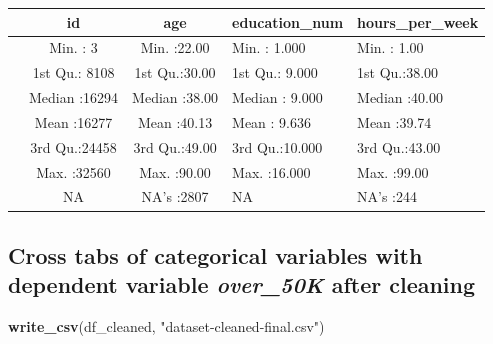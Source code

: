\documentclass[]{article}
\newenvironment{Shaded}{\begin{snugshade}}{\end{snugshade}}
\newcommand{\DataTypeTok}[1]{\textcolor[rgb]{0.13,0.29,0.53}{#1}}
\newcommand{\KeywordTok}[1]{\textcolor[rgb]{0.13,0.29,0.53}{\textbf{#1}}}
\newcommand{\NormalTok}[1]{#1}
\newcommand{\OperatorTok}[1]{\textcolor[rgb]{0.81,0.36,0.00}{\textbf{#1}}}
\newcommand{\StringTok}[1]{\textcolor[rgb]{0.31,0.60,0.02}{#1}}
\begin{document}
\begin{longtable}[]{@{}lccll@{}}
\toprule
& id & age & education\_num & hours\_per\_week\tabularnewline
\midrule
\endhead
& Min. : 3 & Min. :22.00 & Min. : 1.000 & Min. : 1.00\tabularnewline
& 1st Qu.: 8108 & 1st Qu.:30.00 & 1st Qu.: 9.000 & 1st
Qu.:38.00\tabularnewline
& Median :16294 & Median :38.00 & Median : 9.000 & Median
:40.00\tabularnewline
& Mean :16277 & Mean :40.13 & Mean : 9.636 & Mean :39.74\tabularnewline
& 3rd Qu.:24458 & 3rd Qu.:49.00 & 3rd Qu.:10.000 & 3rd
Qu.:43.00\tabularnewline
& Max. :32560 & Max. :90.00 & Max. :16.000 & Max. :99.00\tabularnewline
& NA & NA's :2807 & NA & NA's :244\tabularnewline
\bottomrule
\end{longtable}

\hypertarget{cross-tabs-of-categorical-variables-with-dependent-variable-over_50k-after-cleaning}{%
\subsection{\texorpdfstring{Cross tabs of categorical variables with
dependent variable \emph{over\_50K} after
cleaning}{Cross tabs of categorical variables with dependent variable over\_50K after cleaning}}\label{cross-tabs-of-categorical-variables-with-dependent-variable-over_50k-after-cleaning}}

\begin{Shaded}
\end{Shaded}

\begin{Shaded}
\begin{Highlighting}[]
\KeywordTok{write_csv}\NormalTok{(df_cleaned, }\StringTok{"dataset-cleaned-final.csv"}\NormalTok{)}
\end{Highlighting}
\end{Shaded}
\end{document}

